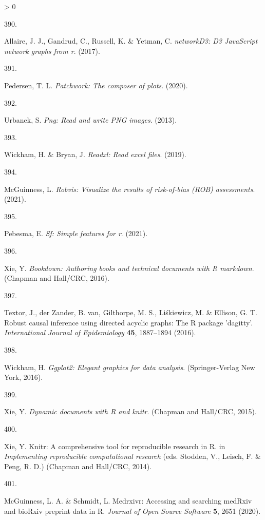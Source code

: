 \documentclass[a4paper, twoside]{templates/ociamthesis}
\newlength{\cslhangindent}
\newlength{\csllabelwidth}
\newenvironment{CSLReferences}[3] %
 {%
  \setlength{\parindent}{0pt}
  \ifodd #1 \everypar{\setlength{\hangindent}{\cslhangindent}}\ignorespaces\fi
  \ifnum #2 > 0
  \setlength{\parskip}{#2\baselineskip}
  \fi
 }%
 {}
\newcommand{\CSLLeftMargin}[1]{\parbox[t]{\maxof{\widthof{#1}}{\csllabelwidth}}{#1}}
\newcommand{\CSLRightInline}[1]{\parbox[t]{\linewidth - \csllabelwidth}{#1}}
\begin{document}
\begin{CSLReferences}{0}{0}
\leavevmode\hypertarget{ref-R-networkD3}{}%
\CSLLeftMargin{390. }
\CSLRightInline{Allaire, J. J., Gandrud, C., Russell, K. \& Yetman, C. \emph{{networkD3}: D3 {JavaScript} network graphs from r}. (2017).}

\leavevmode\hypertarget{ref-R-patchwork}{}%
\CSLLeftMargin{391. }
\CSLRightInline{Pedersen, T. L. \emph{Patchwork: The composer of plots}. (2020).}

\leavevmode\hypertarget{ref-R-png}{}%
\CSLLeftMargin{392. }
\CSLRightInline{Urbanek, S. \emph{Png: Read and write {PNG} images}. (2013).}

\leavevmode\hypertarget{ref-R-readxl}{}%
\CSLLeftMargin{393. }
\CSLRightInline{Wickham, H. \& Bryan, J. \emph{Readxl: Read excel files}. (2019).}

\leavevmode\hypertarget{ref-R-robvis}{}%
\CSLLeftMargin{394. }
\CSLRightInline{McGuinness, L. \emph{Robvis: Visualize the results of risk-of-bias ({ROB}) assessments}. (2021).}

\leavevmode\hypertarget{ref-R-sf}{}%
\CSLLeftMargin{395. }
\CSLRightInline{Pebesma, E. \emph{Sf: Simple features for r}. (2021).}

\leavevmode\hypertarget{ref-bookdown2016}{}%
\CSLLeftMargin{396. }
\CSLRightInline{Xie, Y. \emph{Bookdown: Authoring books and technical documents with {R} markdown}. ({Chapman and Hall/CRC}, 2016).}

\leavevmode\hypertarget{ref-dagitty2016}{}%
\CSLLeftMargin{397. }
\CSLRightInline{Textor, J., der Zander, B. van, Gilthorpe, M. S., Liśkiewicz, M. \& Ellison, G. T. Robust causal inference using directed acyclic graphs: The {R} package 'dagitty'. \emph{International Journal of Epidemiology} \textbf{45}, 1887--1894 (2016).}

\leavevmode\hypertarget{ref-ggplot22016}{}%
\CSLLeftMargin{398. }
\CSLRightInline{Wickham, H. \emph{Ggplot2: Elegant graphics for data analysis}. ({Springer-Verlag New York}, 2016).}

\leavevmode\hypertarget{ref-knitr2015}{}%
\CSLLeftMargin{399. }
\CSLRightInline{Xie, Y. \emph{Dynamic documents with {R} and knitr}. ({Chapman and Hall/CRC}, 2015).}

\leavevmode\hypertarget{ref-knitr2014}{}%
\CSLLeftMargin{400. }
\CSLRightInline{Xie, Y. Knitr: A comprehensive tool for reproducible research in {R}. in \emph{Implementing reproducible computational research} (eds. Stodden, V., Leisch, F. \& Peng, R. D.) ({Chapman and Hall/CRC}, 2014).}

\leavevmode\hypertarget{ref-medrxivr2020}{}%
\CSLLeftMargin{401. }
\CSLRightInline{McGuinness, L. A. \& Schmidt, L. Medrxivr: Accessing and searching {medRxiv} and {bioRxiv} preprint data in {R}. \emph{Journal of Open Source Software} \textbf{5}, 2651 (2020).}


\end{CSLReferences}
\end{document}

